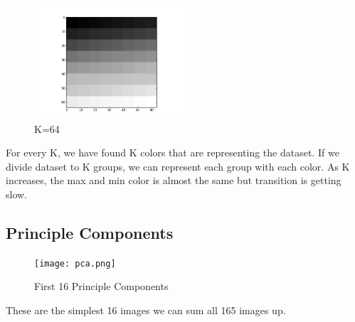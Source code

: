 \documentclass[conference]{IEEEtran}
\begin{document}
    \begin{figure}[htbp]
        \centerline{\includegraphics[width=0.5\textwidth]{64.png}}
        \caption{K=64}
        \label{k64}
    \end{figure}

    For every K, we have found K colors that are representing the dataset. If we divide dataset to K groups, we can represent each group with each color. As K increases, the max and min color is almost the same but transition is getting slow.

    \subsection{Principle Components}

    \begin{figure}[htbp]
        \centerline{\texttt{[image: pca.png]}}
        \caption{First 16 Principle Components}
        \label{pca}
    \end{figure}

    These are the simplest 16 images we can sum all 165 images up.
\end{document}
